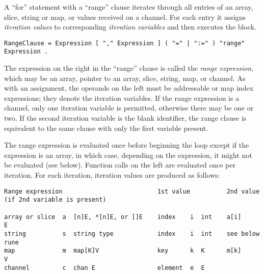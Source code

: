 A ``for'' statement with a ``range'' clause iterates through all entries
of an array, slice, string or map, or values received on a channel. For
each entry it assigns \emph{iteration values} to corresponding
\emph{iteration variables} and then executes the block.

\begin{Verbatim}[frame=single]
RangeClause = Expression [ "," Expression ] ( "=" | ":=" ) "range" Expression .
\end{Verbatim}

The expression on the right in the ``range'' clause is called the
\emph{range expression}, which may be an array, pointer to an array,
slice, string, map, or channel. As with an assignment, the operands on
the left must be addressable or map index
expressions; they denote the iteration variables. If the range
expression is a channel, only one iteration variable is permitted,
otherwise there may be one or two. If the second iteration variable is
the blank identifier, the range clause is
equivalent to the same clause with only the first variable present.

The range expression is evaluated once before beginning the loop except
if the expression is an array, in which case, depending on the
expression, it might not be evaluated (see below). Function calls on the
left are evaluated once per iteration. For each iteration, iteration
values are produced as follows:

\begin{Verbatim}[frame=single]
Range expression                          1st value          2nd value (if 2nd variable is present)

array or slice  a  [n]E, *[n]E, or []E    index    i  int    a[i]       E
string          s  string type            index    i  int    see below  rune
map             m  map[K]V                key      k  K      m[k]       V
channel         c  chan E                 element  e  E
\end{Verbatim}

